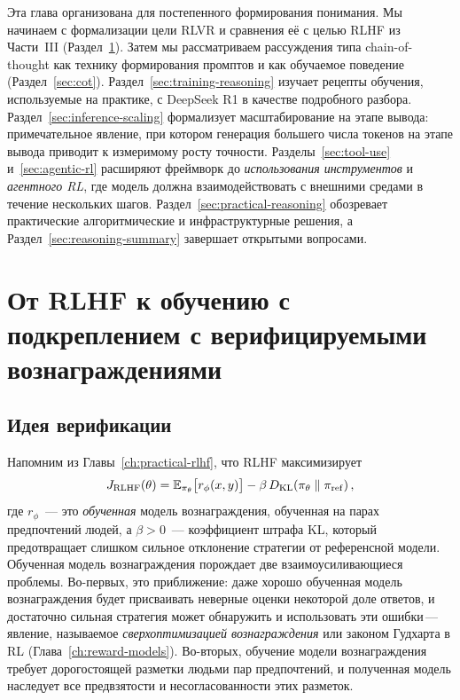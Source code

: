 Эта глава организована для постепенного формирования понимания. Мы начинаем
с формализации цели RLVR и сравнения её с
целью RLHF из Части~III
(Раздел~\ref{sec:rlvr-ch15}). Затем мы рассматриваем рассуждения типа chain-of-thought
как технику формирования промптов и как обучаемое
поведение (Раздел~\ref{sec:cot}). Раздел~\ref{sec:training-reasoning}
изучает рецепты обучения, используемые на практике, с DeepSeek R1 в качестве
подробного разбора. Раздел~\ref{sec:inference-scaling} формализует
масштабирование на этапе вывода: примечательное явление, при котором генерация большего числа
токенов на этапе вывода приводит к измеримому росту точности.
Разделы~\ref{sec:tool-use} и~\ref{sec:agentic-rl} расширяют
фреймворк до \emph{использования инструментов} и \emph{агентного
RL}, где модель должна взаимодействовать с
внешними средами в течение нескольких шагов. Раздел~\ref{sec:practical-reasoning}
обозревает практические алгоритмические и инфраструктурные решения, а
Раздел~\ref{sec:reasoning-summary} завершает открытыми вопросами.

\section{От RLHF к обучению с подкреплением с верифицируемыми вознаграждениями}
\label{sec:rlvr-ch15}

\subsection{Идея верификации}

Напомним из Главы~\ref{ch:practical-rlhf}, что RLHF максимизирует
\begin{equation}
\label{eq:rlhf-objective-ch15}
J_{\mathrm{RLHF}}(\theta)
  = \operatorname{\mathbb{E}}_{\pi_\theta}\bigl[r_\phi(x, y)\bigr]
  - \beta\,D_{\mathrm{KL}}\!\left(\pi_\theta\;\|\;\pi_{\mathrm{ref}}\right),
\end{equation}
где $r_\phi$~--- это \emph{обученная} модель вознаграждения, обученная на парах предпочтений
людей, а $\beta > 0$~--- коэффициент штрафа KL, который
предотвращает слишком сильное отклонение стратегии от референсной модели.
Обученная модель вознаграждения порождает две взаимоусиливающиеся проблемы. Во-первых, это
приближение: даже хорошо обученная модель вознаграждения будет присваивать
неверные оценки некоторой доле ответов, и достаточно сильная стратегия может
обнаружить и использовать эти ошибки\,---\,явление,
называемое \emph{сверхоптимизацией вознаграждения}
или законом Гудхарта в RL (Глава~\ref{ch:reward-models}). Во-вторых,
обучение модели вознаграждения требует дорогостоящей разметки людьми пар
предпочтений, и полученная модель наследует все предвзятости и
несогласованности этих разметок.

